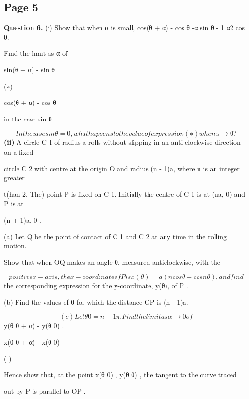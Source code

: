 \documentclass[12pt]{article}
\begin{document}
\subsection*{Page 5}
\begin{flushleft}
\bigskip\textbf{Question 6.} (i) Show that when α is small, cos(θ + α) - cos θ \approx -α sin θ - 1 α2 cos θ.\par
Find the limit as α  of\par
sin(θ + α) - sin θ\par
(∗)\par
cos(θ + α) - cos θ\par
in the case sin θ .\par
\[In the case sin θ = 0, what happens to the value of expression (∗) when α \to 0?\]
\textbf{(ii)} A circle C 1 of radius a rolls without slipping in an anti-clockwise direction on a fixed\par
circle C 2 with centre at the origin O and radius (n - 1)a, where n is an integer greater\par
t(han 2. The) point P is fixed on C 1. Initially the centre of C 1 is at (na, 0) and P is at\par
(n + 1)a, 0 .\par
(a) Let Q be the point of contact of C 1 and C 2 at any time in the rolling motion.\par
Show that when OQ makes an angle θ, measured anticlockwise, with the\par
\[positive x-axis, the x-coordinate of P is x(θ) = a (n cos θ + cos nθ), and find\]
the corresponding expression for the y-coordinate, y(θ), of P .\par
(b) Find the values of θ for which the distance OP is (n - 1)a.\par
\[(c) Let θ 0 = n - 1 \pi. Find the limit as α \to 0 of\]
y(θ 0 + α) - y(θ 0) .\par
x(θ 0 + α) - x(θ 0)\par
( )\par
Hence show that, at the point x(θ 0) , y(θ 0) , the tangent to the curve traced\par
out by P is parallel to OP .\par
\end{flushleft}
\end{document}
